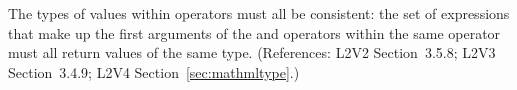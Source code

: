 The types of values within  operators must all
be consistent: the set of expressions that make up the first
arguments of the  and  operators
within the same  operator must all return
values of the same type.  (References: L2V2 Section~3.5.8; L2V3 
Section~3.4.9; L2V4 Section~\ref{sec:mathmltype}.)

